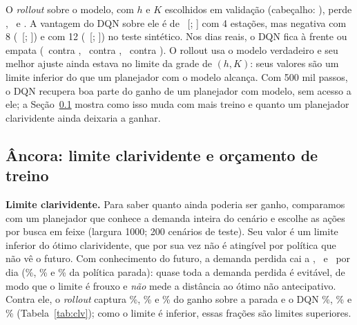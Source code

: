 \documentclass[12pt,a4paper]{article}
\begin{document}
O \emph{rollout} sobre o modelo, com $h$ e $K$ escolhidos em valida\c{c}\~ao (cabe\c{c}alho: \rollCfg), perde \rollA, \rollB\ e \rollC. A vantagem do DQN sobre ele \'e de \dqnMenosRollA\
[\dqnMenosRollLoA; \dqnMenosRollHiA] com 4 esta\c{c}\~oes, mas negativa com 8 (\dqnMenosRollB\ [\dqnMenosRollLoB; \dqnMenosRollHiB]) e com 12
(\dqnMenosRollC\ [\dqnMenosRollLoC; \dqnMenosRollHiC]) no teste sint\'etico. Nos dias reais, o DQN fica \`a frente ou empata (\dqnRA\ contra \rollRA,
\dqnRB\ contra \rollRB, \dqnRC\ contra \rollRC). O rollout usa o modelo verdadeiro e seu melhor ajuste ainda estava no limite da grade de $(h,K)$:
seus valores s\~ao um limite inferior do que um planejador com o modelo alcan\c{c}a. Com 500 mil passos, o DQN recupera boa parte do ganho de um planejador com modelo, sem acesso a ele;
a Se\c{c}\~ao~\ref{sec:ancora} mostra como isso muda com mais treino e quanto um planejador clarividente ainda deixaria a ganhar.

\begin{table}[t]
\centering\scriptsize
\setlength{\tabcolsep}{3pt}
\resizebox{\textwidth}{!}{}
\caption{Demanda perdida por dia: m\'edia [IC95\% sobre sementes]. Gerada automaticamente dos arquivos de execu\c{c}\~ao.}
\label{tab:resultados}
\end{table}

\subsection{\^Ancora: limite clarividente e or\c{c}amento de treino}\label{sec:ancora}
\textbf{Limite clarividente.} Para saber quanto ainda poderia ser ganho, comparamos com um planejador que conhece a demanda inteira do cen\'ario e escolhe as
a\c{c}\~oes por busca em feixe (largura 1000; 200 cen\'arios de teste). Seu valor \'e um limite inferior do \'otimo clarividente, que por sua vez n\~ao \'e
ating\'ivel por pol\'itica que n\~ao v\^e o futuro. Com conhecimento do futuro, a demanda perdida cai a \clvA, \clvB\ e \clvC\ por dia (\clvPctA\%, \clvPctB\% e
\clvPctC\% da pol\'itica parada): quase toda a demanda perdida \'e evit\'avel, de modo que o limite \'e frouxo e \emph{n\~ao} mede a dist\^ancia ao \'otimo n\~ao
antecipativo. Contra ele, o \emph{rollout} captura \fracRollA\%, \fracRollB\% e \fracRollC\% do ganho sobre a parada e o DQN \fracDqnA\%, \fracDqnB\% e
\fracDqnC\% (Tabela~\ref{tab:clv}); como o limite \'e inferior, essas fra\c{c}\~oes s\~ao limites superiores.

\begin{table}[t]
\centering\small

\caption{Demanda perdida por dia nos 200 primeiros cen\'arios de teste. Ganho capturado = (parada $-$ m\'etodo)/(parada $-$ clarividente), em \%.}
\label{tab:clv}
\end{table}
\end{document}
